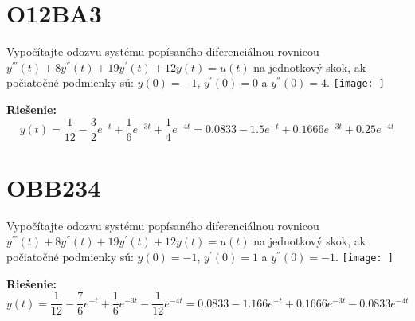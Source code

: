 \documentclass[a4paper, 12pt]{article}
\newenvironment{task}{}{}
\newenvironment{solution}{\noindent\textbf{Riešenie:}}{}
\begin{document}
\section*{O12BA3}
\begin{task}
    Vypočítajte odozvu systému popísaného diferenciálnou rovnicou $y^{'''}(t)+8y^{''}(t)+19y^{'}(t)+12y(t)=u(t)$ na jednotkový skok, ak počiatočné podmienky sú: $y(0)=-1$, $y^{'}(0)=0$ a $y^{''}(0)=4$.
    \texttt{[image: ]}
\end{task} 

\begin{solution}
    \begin{equation*}
        y(t)=\dfrac{1}{12} - \dfrac{3}{2}e^{-t} + \dfrac{1}{6}e^{-3t} + \dfrac{1}{4}e^{-4t} = 0.0833 -1.5 e^{-t} + 0.1666 e^{-3t} + 0.25 e^{-4t}
    \end{equation*}
\end{solution}


\section*{OBB234}
\begin{task}
    Vypočítajte odozvu systému popísaného diferenciálnou rovnicou $y^{'''}(t)+8y^{''}(t)+19y^{'}(t)+12y(t)=u(t)$ na jednotkový skok, ak počiatočné podmienky sú: $y(0)=-1$, $y^{'}(0)=1$ a $y^{''}(0)=-1$.
    \texttt{[image: ]}
\end{task} 

\begin{solution}
    \begin{equation*}
        y(t)=\dfrac{1}{12} - \dfrac{7}{6}e^{-t} + \dfrac{1}{6}e^{-3t} - \dfrac{1}{12}e^{-4t} = 0.0833 -1.166 e^{-t} + 0.1666 e^{-3t} - 0.0833 e^{-4t}
    \end{equation*}
\end{solution}
\end{document}
